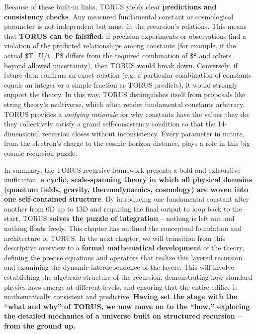 \documentclass[
]{article}
\begin{document}
Because of these built-in links, TORUS yields clear \textbf{predictions
and consistency checks}. Any measured fundamental constant or
cosmological parameter is not independent but must fit the recursion's
relations. This means that \textbf{TORUS can be falsified}: if precision
experiments or observations find a violation of the predicted
relationships among constants (for example, if the actual \$T\_U/t\_P\$
differs from the required combination of \$\alpha\$ and others beyond allowed
uncertainty), then TORUS would break down\hspace{0pt}. Conversely, if
future data confirms an exact relation (e.g. a particular combination of
constants equals an integer or a simple fraction as TORUS predicts), it
would strongly support the theory. In this way, TORUS distinguishes
itself from proposals like string theory's multiverse, which often
render fundamental constants arbitrary. TORUS provides a \emph{unifying
rationale} for why constants have the values they do: they collectively
satisfy a grand self-consistency condition so that the 14-dimensional
recursion closes without inconsistency. Every parameter in nature, from
the electron's charge to the cosmic horizon distance, plays a role in
this big cosmic recursion puzzle.

In summary, the TORUS recursive framework presents a bold and exhaustive
unification: \textbf{a cyclic, scale-spanning theory in which all
physical domains (quantum fields, gravity, thermodynamics, cosmology)
are woven into one self-contained structure}. By introducing one
fundamental constant after another from 0D up to 13D and requiring the
final output to loop back to the start, TORUS \textbf{solves the puzzle
of integration} -- nothing is left out and nothing floats freely. This
chapter has outlined the conceptual foundation and architecture of
TORUS. In the next chapter, we will transition from this descriptive
overview to a \textbf{formal mathematical development} of the theory,
defining the precise equations and operators that realize this layered
recursion and examining the dynamic interdependence of the layers. This
will involve establishing the algebraic structure of the recursion,
demonstrating how standard physics laws emerge at different levels, and
ensuring that the entire edifice is mathematically consistent and
predictive. \textbf{Having set the stage with the ``what and why'' of
TORUS, we now move on to the ``how,'' exploring the detailed mechanics
of a universe built on structured recursion -- from the ground up.}
\end{document}
